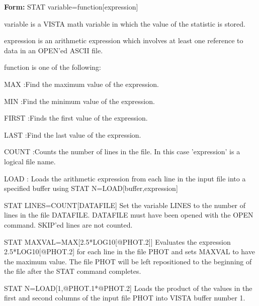 {\newpage\clearpage
{}%
\begin{command}
  \item[\textbf{Form: } STAT variable=function{[expression]}\hfill]{}
  \item[variable]{is a VISTA math variable in which the
       value of the statistic is stored.}
  \item[expression]{is an arithmetic expression which involves
       at least one reference to data in an OPEN'ed ASCII file.}
  \item[function]{is one of the following:}
  \item{MAX :Find the maximum value of the expression.}
  \item{MIN :Find the minimum value of the expression.}
  \item{FIRST :Finds the first value of the expression.}
  \item{LAST :Find the last value of the expression.}
  \item{COUNT :Counts the number of lines in the file.
        In this case 'expression' is a logical file name.}
  \item{LOAD   :  Loads the arithmetic expression from each
       line in the input file into a specified buffer
       using STAT N=LOAD{[buffer,expression]}}
\end{command}%
\lthtmlfigureZ
\lthtmlcheckvsize\clearpage}

{\newpage\clearpage
{}%
\begin{example}
  \item[STAT LINES=COUNT{[DATAFILE]}\hfill]{ Set the variable LINES to the
       number of lines in the file DATAFILE.  DATAFILE must have been
       opened with the OPEN command.  SKIP'ed lines are not counted.}
\par\item[STAT MAXVAL=MAX{[2.5*LOG10{[@PHOT.2]}]}\hfill]{ Evaluates the
       expression 2.5*LOG10{[@PHOT.2]} for each line in the file PHOT and
       sets MAXVAL to have the maximum value.  The file PHOT will be left
       repositioned to the beginning of the file after the STAT command
       completes.}
\par\item[STAT N=LOAD{[1,@PHOT.1*@PHOT.2]}\hfill]{ Loads the product of the
       values in the first and second columns of the input file PHOT into
       VISTA buffer number 1.}
\end{example}%
\lthtmlfigureZ
\lthtmlcheckvsize\clearpage}

